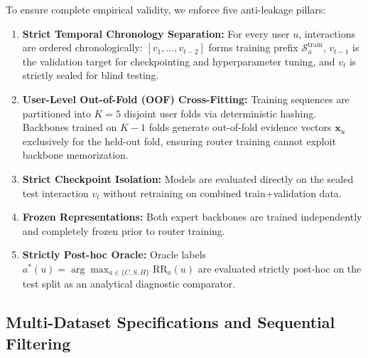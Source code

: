To ensure complete empirical validity, we enforce five anti-leakage pillars:
\begin{enumerate}[leftmargin=*]
    \item \textbf{Strict Temporal Chronology Separation:} For every user $u$, interactions are ordered chronologically: $[v_1, \dots, v_{t-2}]$ forms training prefix $\mathcal{S}_u^{\text{train}}$, $v_{t-1}$ is the validation target for checkpointing and hyperparameter tuning, and $v_t$ is strictly sealed for blind testing.
    \item \textbf{User-Level Out-of-Fold (OOF) Cross-Fitting:} Training sequences are partitioned into $K=5$ disjoint user folds via deterministic hashing. Backbones trained on $K-1$ folds generate out-of-fold evidence vectors $\mathbf{x}_u$ exclusively for the held-out fold, ensuring router training cannot exploit backbone memorization.
    \item \textbf{Strict Checkpoint Isolation:} Models are evaluated directly on the sealed test interaction $v_t$ without retraining on combined train+validation data.
    \item \textbf{Frozen Representations:} Both expert backbones are trained independently and completely frozen prior to router training.
    \item \textbf{Strictly Post-hoc Oracle:} Oracle labels $a^*(u) = \arg\max_{a \in \{C, S, H\}} \text{RR}_a(u)$ are evaluated strictly post-hoc on the test split as an analytical diagnostic comparator.
\end{enumerate}

\subsection{Multi-Dataset Specifications and Sequential Filtering}
\label{sec:datasets}

